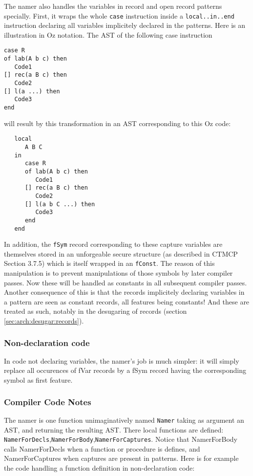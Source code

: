 \documentclass[a4paper]{memoir}
\begin{document}
The namer also handles the variables in record and open record patterns specially.
First, it wraps the whole \lstinline!case! instruction inside a \lstinline!local..in..end! instruction declaring all variables implicitely declared in the patterns. Here is an illustration in Oz notation.
The AST of the following case instruction

\begin{lstlisting}
case R
of lab(A b c) then
   Code1
[] rec(a B c) then
   Code2
[] l(a ...) then
   Code3
end
\end{lstlisting}

will result by this transformation in an AST corresponding to this Oz code:

\begin{lstlisting}
   local 
      A B C
   in
      case R
      of lab(A b c) then
         Code1
      [] rec(a B c) then
         Code2
      [] l(a b C ...) then
         Code3
      end
   end
\end{lstlisting}

In addition, the \lstinline!fSym! record corresponding to these capture variables are themselves stored in an unforgeable secure structure (as described in CTMCP Section 3.7.5) which is itself wrapped in an \lstinline!fConst!. The reason of this manipulation is to prevent manipulations of those symbols by later compiler passes. Now these will be handled as constants in all subsequent compiler passes. Another consequence of this is that the records implicitely declaring variables in a pattern are seen as constant records, all features being constants! And these are treated as such, notably in the desugaring of records (section \ref{sec:arch:desugar:records}).

\subsubsection{Non-declaration code}
In code not declaring variables, the namer's job is much simpler: it will simply replace all occurences of fVar records by a fSym record having the corresponding symbol as first feature.
\subsubsection{Compiler Code Notes}
The namer is one function unimaginatively named \lstinline!Namer! taking as argument an AST, and returning the resulting AST.
There local functions are defined: \lstinline!NamerForDecls!,\lstinline!NamerForBody!,\lstinline!NamerForCaptures!.
Notice that NamerForBody calls NamerForDecls when a function or procedure is defines, and NamerForCaptures when captures are present in patterns. Here is for example the code handling a function definition in non-declaration code:
\end{document}
